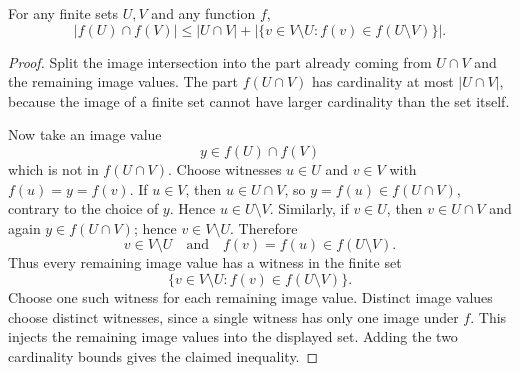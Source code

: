 \begin{lemma}
For any finite sets $U, V$ and any function $f$,
\[ |f(U) \cap f(V)| \le |U \cap V| + |\{v \in V \setminus U : f(v) \in f(U \setminus V)\}|. \]
\end{lemma}
\begin{proof}
Split the image intersection into the part already coming from
\(U\cap V\) and the remaining image values.  The part \(f(U\cap V)\) has
cardinality at most \(|U\cap V|\), because the image of a finite set cannot
have larger cardinality than the set itself.

Now take an image value
\[
y\in f(U)\cap f(V)
\]
which is not in \(f(U\cap V)\).  Choose witnesses \(u\in U\) and \(v\in V\)
with \(f(u)=y=f(v)\).  If \(u\in V\), then \(u\in U\cap V\), so
\(y=f(u)\in f(U\cap V)\), contrary to the choice of \(y\).  Hence
\(u\in U\setminus V\).  Similarly, if \(v\in U\), then \(v\in U\cap V\) and
again \(y\in f(U\cap V)\); hence \(v\in V\setminus U\).  Therefore
\[
v\in V\setminus U
\quad\text{and}\quad
f(v)=f(u)\in f(U\setminus V).
\]
Thus every remaining image value has a witness in the finite set
\[
\{v\in V\setminus U:f(v)\in f(U\setminus V)\}.
\]
Choose one such witness for each remaining image value.  Distinct image
values choose distinct witnesses, since a single witness has only one image
under \(f\).  This injects the remaining image values into the displayed set.
Adding the two cardinality bounds gives the claimed inequality.
\end{proof}
